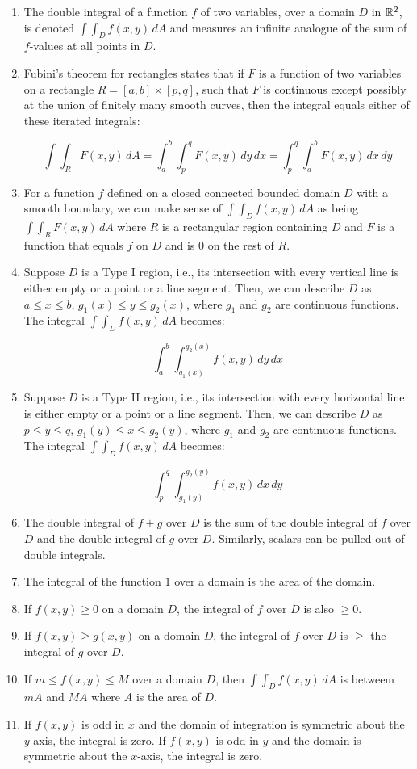 \documentclass[10pt]{amsart}
\begin{document}
\begin{enumerate}
\item The double integral of a function $f$ of two variables, over a
  domain $D$ in $\mathbb{R}^2$, is denoted $\int \int_D f(x,y) \, dA$ and
  measures an infinite analogue of the sum of $f$-values at all points
  in $D$.
\item Fubini's theorem for rectangles states that if $F$ is a function
  of two variables on a rectangle $R = [a,b] \times [p,q]$, such that
  $F$ is continuous except possibly at the union of finitely many
  smooth curves, then the integral equals either of these iterated
  integrals:

  $$\int \int_R F(x,y) \, dA = \int_a^b \int_p^q F(x,y) \, dy \, dx = \int_p^q \int_a^b F(x,y) \, dx \, dy$$

\item For a function $f$ defined on a closed connected bounded domain
  $D$ with a smooth boundary, we can make sense of $\int \int_D f(x,y)
  \, dA$ as being $\int \int_R F(x,y) \, dA$ where $R$ is a
  rectangular region containing $D$ and $F$ is a function that equals
  $f$ on $D$ and is $0$ on the rest of $R$.
\item Suppose $D$ is a Type I region, i.e., its intersection with
  every vertical line is either empty or a point or a line
  segment. Then, we can describe $D$ as $a \le x \le b$, $g_1(x) \le y
  \le g_2(x)$, where $g_1$ and $g_2$ are continuous functions. The
  integral $\int \int_D f(x,y) \, dA$ becomes:

  $$\int_a^b \int_{g_1(x)}^{g_2(x)} f(x,y) \, dy \, dx$$

\item Suppose $D$ is a Type II region, i.e., its intersection with
  every horizontal line is either empty or a point or a line
  segment. Then, we can describe $D$ as $p \le y \le q$, $g_1(y) \le x
  \le g_2(y)$, where $g_1$ and $g_2$ are continuous functions. The
  integral $\int \int_D f(x,y) \, dA$ becomes:

  $$\int_p^q \int_{g_1(y)}^{g_2(y)} f(x,y) \, dx \, dy$$

\item The double integral of $f + g$ over $D$ is the sum of the double
  integral of $f$ over $D$ and the double integral of $g$ over
  $D$. Similarly, scalars can be pulled out of double integrals.
\item The integral of the function $1$ over a domain is the area of
  the domain.
\item If $f(x,y) \ge 0$ on a domain $D$, the integral of $f$ over $D$
  is also $\ge 0$.
\item If $f(x,y) \ge g(x,y)$ on a domain $D$, the integral of $f$ over
  $D$ is $\ge$ the integral of $g$ over $D$.
\item If $m \le f(x,y) \le M$ over a domain $D$, then $\int \int_D
  f(x,y) \, dA$ is betweem $mA$ and $MA$ where $A$ is the area of $D$.
\item If $f(x,y)$ is odd in $x$ and the domain of integration is
  symmetric about the $y$-axis, the integral is zero. If $f(x,y)$ is
  odd in $y$ and the domain is symmetric about the $x$-axis, the
  integral is zero.
\end{enumerate}
\end{document}
